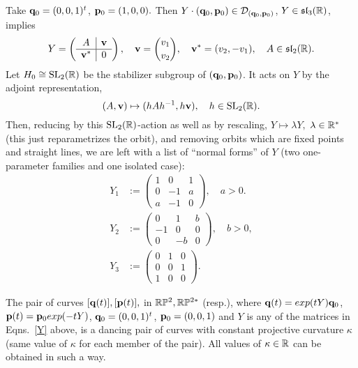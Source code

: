  
 
 
  

 Take $\mathbf q_0=(0, 0, 1)^t$, ${\mathbf p}_0=(1,0,0).$ Then $Y\cdot(\mathbf q_0,{\mathbf p}_0)\in{\mathcal D}_{(\mathbf q_0,{\mathbf p}_0)}$, $Y\in\mathfrak{sl}_3(\mathbb{R})$,  implies 
$$Y=
\left(\begin{array}{c|c}A&{\mathbf v}\\ \hline{\mathbf v}^*& 0\end{array}\right),\quad 
{\mathbf v}={v_1\choose v_2}, \quad {\mathbf v}^*=(v_2, -v_1), \quad A\in\mathfrak{sl}_2(\mathbb{R}).$$
%
Let $H_0\cong {\mathrm{SL}_2(\mathbb{R})}$ be the stabilizer subgroup of $(\mathbf q_0, {\mathbf p}_0)$. It  acts on $Y$ by the adjoint representation, $$(A,{\mathbf v})\mapsto (hAh^{-1}, h{\mathbf v}), \quad h\in{\mathrm{SL}_2(\mathbb{R})}.$$ Then, reducing by this ${\mathrm{SL}_2(\mathbb{R})}$-action as well as by rescaling, $Y\mapsto \lambda Y, $ $ \lambda\in\mathbb{R}^*$ (this just reparametrizes the orbit), and  removing orbits which are fixed points and straight lines, we are left with a list of ``normal forms''  of $Y$ (two one-parameter families and one isolated case):
\begin{subequations}\label{Y}

\begin{align}  Y_1&:=
 \left( 
\begin{array}{rrr} 
1& 0 &1\\ 
0&-1&a\\ 
a&-1&0
\end {array} 
\right), 
\quad a> 0.\\  
%
Y_2&:=
\left( \begin{array}{rrr} 
0&1&b\\
-1&0&0\\
0&-b&0
\end{array} 
\right), 
\quad b>0,\\ 
Y_3&:=
\left(
\begin{array}{rrr}
0 &1&0\\ 
0&0&1\\ 
1&0&0
\end{array} 
\right).
%
\end{align}
\end{subequations}


\begin{proposition} The pair of curves $[\mathbf q(t)], [{\mathbf p}(t)],$ in $\mathbb{R}\mathbb{P}^2, \mathbb{R}\mathbb{P}^{2*}$ (resp.), where $\mathbf q(t)=exp(tY)\mathbf q_0$, ${\mathbf p}(t)={\mathbf p}_0exp(-tY)$,
  $\mathbf q_0=(0,0,1)^t$, ${\mathbf p}_0=(0,0,1)$ and $Y$ is any of the matrices in Eqns.~\eqref{Y} above, is a dancing pair  of curves with constant projective curvature $\kappa$ (same value of $\kappa$ for each member of the pair). All values of $\kappa\in\mathbb{R}$ can be obtained in such a way. 
  

\end{proposition}

